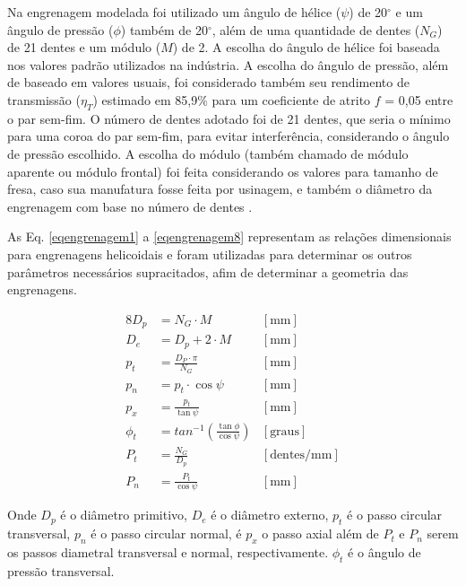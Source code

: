Na engrenagem modelada foi utilizado um ângulo de hélice ($\psi$) de 20$^{\circ}$ e um ângulo de pressão ($\phi$) também de 20$^{\circ}$, além de uma quantidade de dentes ($N_G$) de 21 dentes e um módulo ($M$) de 2. A escolha do ângulo de hélice foi baseada nos valores padrão utilizados na indústria. A escolha do ângulo de pressão, além de baseado em valores usuais, foi considerado também seu rendimento de transmissão ($\eta_T$) estimado em 85,9$\%$ para um coeficiente de atrito $f$ = 0,05 entre o par sem-fim. O número de dentes adotado foi de 21 dentes, que seria o mínimo para uma coroa do par sem-fim, para evitar interferência, considerando o ângulo de pressão escolhido. A escolha do módulo (também chamado de módulo aparente ou módulo frontal) foi feita considerando os valores para tamanho de fresa, caso sua manufatura fosse feita por usinagem, e também o diâmetro da engrenagem com base no número de dentes \cite{shigley2005}.

As Eq. \ref{eqengrenagem1} a \ref{eqengrenagem8} representam as relações dimensionais para engrenagens helicoidais \cite{shigley2005} e foram utilizadas para determinar os outros parâmetros necessários supracitados, afim de determinar a geometria das engrenagens. 

\begin{alignat}{8}
\label{eqengrenagem1}
    D_p & = N_G \cdot M & [\text{mm}]\\
\label{eqengrenagem2}
    D_e & = D_p + 2 \cdot M & [\text{mm}] \\
\label{eqengrenagem3}
    p_t & = \frac{D_P \cdot \pi}{N_G} & [\text{mm}] \\
\label{eqengrenagem4}
    p_n & = p_t \cdot \cos{\psi} & [\text{mm}] \\
\label{eqengrenagem5}
    p_x & = \frac{p_t}{\tan{\psi}} & [\text{mm}]\\
\label{eqengrenagem6}
    \phi_t & = tan^{-1}\left(\frac{\tan{\phi}}{\cos{\psi}}\right) & [\text{graus}] \\
\label{eqengrenagem7}
    P_t & = \frac{N_G}{D_p} & [\text{dentes/mm}]\\
\label{eqengrenagem8}
    P_n & = \frac{P_t}{\cos{\psi}} & [\text{mm}]
\end{alignat}


Onde $D_p$ é o diâmetro primitivo, $D_e$ é o diâmetro externo, $p_t$ é o passo circular transversal, $p_n$ é o passo circular normal, é $p_x$ o passo axial além de $P_t$ e $P_n$ serem os passos diametral transversal e normal, respectivamente. $\phi_t$ é o ângulo de pressão transversal. 

